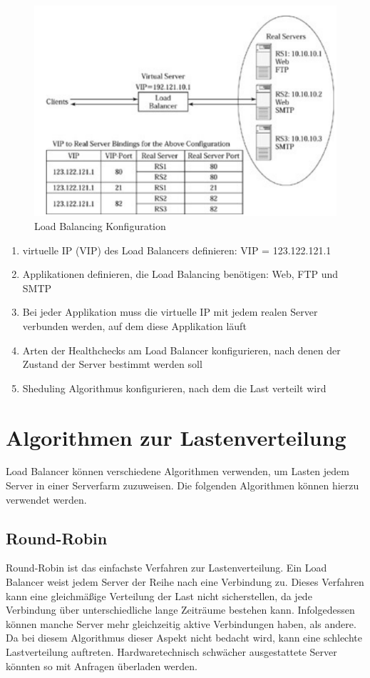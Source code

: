 \begin{figure}[!h]
	\begin{center}
		\includegraphics[width=0.6\linewidth]{images/loadbalancing8.jpg}
		\caption{Load Balancing Konfiguration \cite{LoadBalancing2}}
		\label{Load Balancing Konfiguration}
	\end{center}
\end{figure}
\begin{enumerate}
\item virtuelle IP (VIP) des Load Balancers definieren: VIP = 123.122.121.1
\item Applikationen definieren, die Load Balancing benötigen: Web, FTP und SMTP
\item Bei jeder Applikation muss die virtuelle IP mit jedem realen Server verbunden werden, auf dem diese Applikation läuft
\item Arten der Healthchecks am Load Balancer konfigurieren, nach denen der Zustand der Server bestimmt werden soll
\item Sheduling Algorithmus konfigurieren, nach dem die Last verteilt wird \cite{LoadBalancing2}
\end{enumerate}

\section{Algorithmen zur Lastenverteilung}
\label{sec:Algorithmen zur Lastenverteilung}
Load Balancer können verschiedene Algorithmen verwenden, um Lasten jedem Server in einer Serverfarm zuzuweisen. Die folgenden Algorithmen können hierzu verwendet werden.

\subsection{Round-Robin}
\label{sec:Round-Robin}
Round-Robin ist das einfachste Verfahren zur Lastenverteilung.
Ein Load Balancer weist jedem Server der Reihe nach eine Verbindung zu.
Dieses Verfahren kann eine gleichmäßige Verteilung der Last nicht sicherstellen, da jede Verbindung über unterschiedliche lange Zeiträume bestehen kann. Infolgedessen können manche Server mehr gleichzeitig aktive Verbindungen haben, als andere. \cite{LoadBalancing2}
Da bei diesem Algorithmus dieser Aspekt nicht bedacht wird, kann eine schlechte Lastverteilung auftreten. Hardwaretechnisch schwächer ausgestattete Server könnten so mit Anfragen überladen werden.

